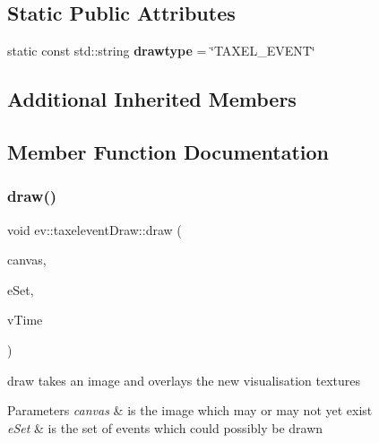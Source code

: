 \subsection*{Static Public Attributes}
\begin{DoxyCompactItemize}
\item 
\mbox{\label{classev_1_1taxeleventDraw_af7df65142d28c9a698b33622ded9169c}} 
static const std\+::string {\bfseries drawtype} = \char`\"{}T\+A\+X\+E\+L\+\_\+\+E\+V\+E\+NT\char`\"{}
\end{DoxyCompactItemize}
\subsection*{Additional Inherited Members}


\subsection{Member Function Documentation}
\mbox{\label{classev_1_1taxeleventDraw_ad2ff0348ee1b362e3c50508ffefdf9d1}} 
\subsubsection{\texorpdfstring{draw()}{draw()}}
{\footnotesize\ttfamily void ev\+::taxelevent\+Draw\+::draw (\begin{DoxyParamCaption}\item[{cv\+::\+Mat \&}]{canvas,  }\item[{const ev\+::v\+Queue \&}]{e\+Set,  }\item[{int}]{v\+Time }\end{DoxyParamCaption})\hspace{0.3cm}{\ttfamily [virtual]}}



draw takes an image and overlays the new visualisation textures 


\begin{DoxyParams}{Parameters}
{\em canvas} & is the image which may or may not yet exist \\
\hline
{\em e\+Set} & is the set of events which could possibly be drawn \\
\hline
\end{DoxyParams}


